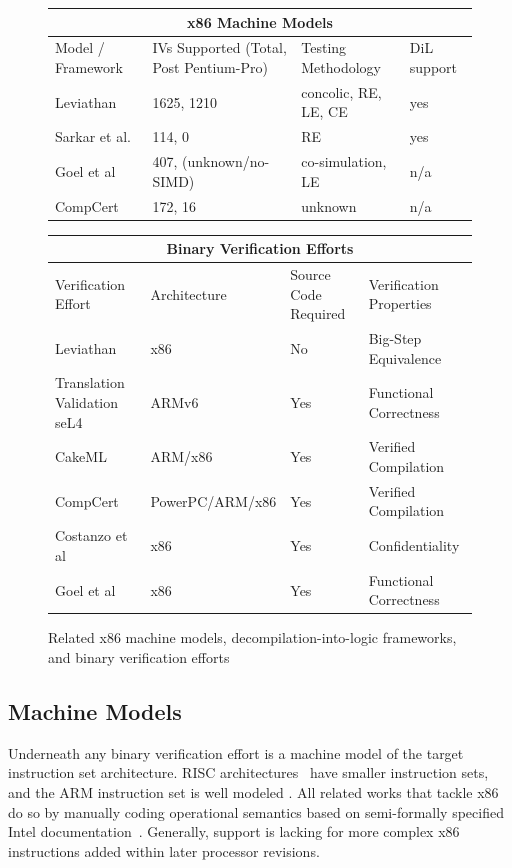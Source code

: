 \begin{figure}
\begin{tabular}{ |p{4cm}||p{6cm}|p{3.5cm}|p{2.5cm}|  }
 \hline
 \multicolumn{4}{|c|}{x86 Machine Models} \\
 \hline
Model / Framework & IVs Supported (Total, Post Pentium-Pro)& Testing Methodology & DiL support \\
 \hline
 Leviathan   & 1625, 1210 & concolic, RE, LE, CE &   yes \\
 Sarkar et al. \cite{sarkar2009semantics}& 114, 0   & RE & yes\\
 Goel et al  \cite{hunt2012towards,kaufmann2013computer,Goel14, goel2017engineering} &407, (unknown/no-SIMD) & co-simulation, LE &  n/a\\
  CompCert \cite{Leroy-backend, leroy2009formal, leroy2012compcert} &172, 16 & unknown &  n/a\\
\hline
\end{tabular}
\begin{tabular}{ |p{5cm}||p{3.5cm}|p{3.5cm}|p{4cm}|  }
 \hline
 \multicolumn{4}{|c|}{Binary Verification Efforts} \\
 \hline
Verification Effort& Architecture & Source Code Required & Verification Properties \\
 \hline
 Leviathan   &x86 & No & Big-Step Equivalence\\
 Translation Validation seL4 \cite{sewell2013translation, klein2009sel4} & ARMv6 & Yes & Functional Correctness\\
 CakeML \cite{kumar2014cakeml}& ARM/x86 & Yes&  Verified Compilation \\
 CompCert \cite{Leroy-backend, leroy2009formal, leroy2012compcert}& PowerPC/ARM/x86 & Yes&  Verified Compilation \\
 Costanzo et al  \cite{costanzo2016end}& x86 & Yes&  Confidentiality \\
  Goel et al  \cite{Goel14} & x86 & Yes &  Functional Correctness\\
 \hline
\end{tabular}
\caption{Related x86 machine models, decompilation-into-logic frameworks, and binary verification efforts}
\label{fig:related_works}
\end{figure}

\subsection{Machine Models}
Underneath any binary verification effort is a machine model of the target instruction set architecture. 
RISC architectures~\cite{arm2012architecture} have smaller instruction sets, and the ARM instruction set is well modeled \cite{fox2010trustworthy}.
All related works that tackle x86 do so by manually coding operational semantics based on semi-formally specified Intel documentation~\cite{guide2011intel}.
Generally, support is lacking for more complex x86 instructions added within later processor revisions. 

